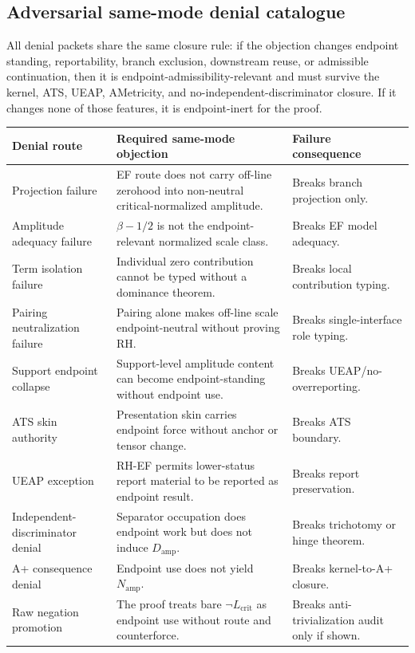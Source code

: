 \documentclass[11pt]{article}
\newcommand{\Lcrit}{L_{\mathrm{crit}}}
\newcommand{\Damp}{D_{\mathrm{amp}}}
\newcommand{\Namp}{N_{\mathrm{amp}}}
\begin{document}
\subsection{Adversarial same-mode denial catalogue}

All denial packets share the same closure rule: if the objection changes endpoint standing, reportability, branch exclusion, downstream reuse, or admissible continuation, then it is endpoint-admissibility-relevant and must survive the kernel, ATS, UEAP, AMetricity, and no-independent-discriminator closure.  If it changes none of those features, it is endpoint-inert for the proof.

\begingroup\small
\begin{longtable}{L{0.26\textwidth}L{0.39\textwidth}L{0.25\textwidth}}
\toprule
\textbf{Denial route} & \textbf{Required same-mode objection} & \textbf{Failure consequence}\\
\midrule
Projection failure & EF route does not carry off-line zerohood into non-neutral critical-normalized amplitude. & Breaks branch projection only.\\
Amplitude adequacy failure & \(\beta-1/2\) is not the endpoint-relevant normalized scale class. & Breaks EF model adequacy.\\
Term isolation failure & Individual zero contribution cannot be typed without a dominance theorem. & Breaks local contribution typing.\\
Pairing neutralization failure & Pairing alone makes off-line scale endpoint-neutral without proving RH. & Breaks single-interface role typing.\\
Support endpoint collapse & Support-level amplitude content can become endpoint-standing without endpoint use. & Breaks UEAP/no-overreporting.\\
ATS skin authority & Presentation skin carries endpoint force without anchor or tensor change. & Breaks ATS boundary.\\
UEAP exception & RH-EF permits lower-status report material to be reported as endpoint result. & Breaks report preservation.\\
Independent-discriminator denial & Separator occupation does endpoint work but does not induce \(\Damp\). & Breaks trichotomy or hinge theorem.\\
A+ consequence denial & Endpoint use does not yield \(\Namp\). & Breaks kernel-to-A+ closure.\\
Raw negation promotion & The proof treats bare \(\neg\Lcrit\) as endpoint use without route and counterforce. & Breaks anti-trivialization audit only if shown.\\

\end{longtable}
\end{document}
